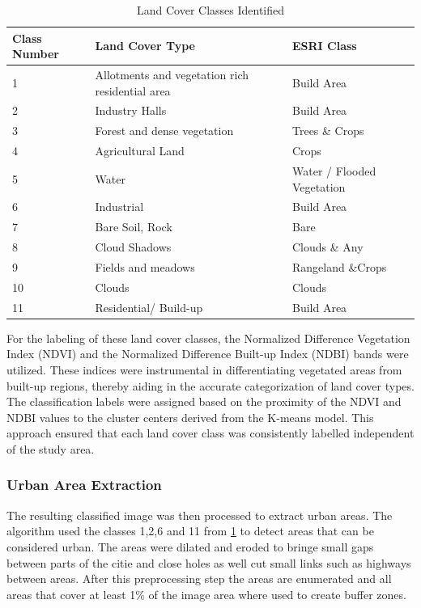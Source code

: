 \documentclass[12pt,a4paper, english]{article}
\begin{document}
    \begin{table}[h]
    \centering
    \caption{Land Cover Classes Identified\label{tab:land_cover_classes}}
    \begin{tabular}{lp{4cm}l}
    \toprule
    \textbf{Class Number} & \textbf{Land Cover Type} & \textbf{ESRI Class}\\
    \midrule
    1 &  Allotments and vegetation rich residential area  & Build Area\\
    2 &  Industry Halls & Build Area\\
    3 &  Forest and dense vegetation& Trees \& Crops\\
    4 &  Agricultural Land & Crops\\
    5 &  Water& Water / Flooded Vegetation\\
    6 &  Industrial& Build Area\\
    7 &  Bare Soil, Rock & Bare \\
    8 &  Cloud Shadows & Clouds \& Any \\
    9 &  Fields and meadows& Rangeland \&Crops \\
    10 &  Clouds & Clouds \\
    11 &  Residential/ Build-up& Build Area\\
    \bottomrule
    \end{tabular}
    \end{table}
    For the labeling of these land cover classes, the Normalized Difference Vegetation Index (NDVI) and the Normalized Difference Built-up Index (NDBI) bands were utilized.
    These indices were instrumental in differentiating vegetated areas from built-up regions, thereby aiding in the accurate categorization of land cover types.
    The classification labels were assigned based on the proximity of the NDVI and NDBI values to the cluster centers derived from the K-means model.
    This approach ensured that each land cover class was consistently labelled independent of the study area.\\
    \subsubsection{Urban Area Extraction}
    The resulting classified image was then processed to extract urban areas.
    The algorithm used the classes 1,2,6 and 11 from \cref{tab:land_cover_classes} to detect areas that can be considered urban.
    The areas were \gls{dilated} and \gls{eroded} to bringe small gaps between parts of the citie and close holes as well cut small links such as highways between areas.
    After this preprocessing step the areas are enumerated and all areas that cover at least 1\% of the image area where used to create buffer zones. 
\end{document}
